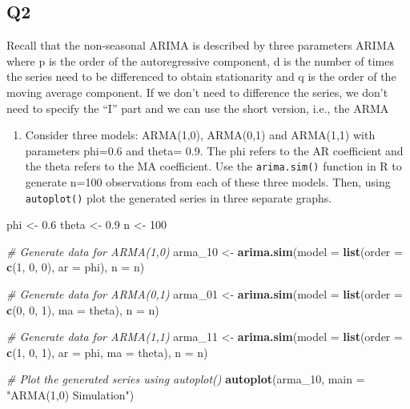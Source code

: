 \documentclass[
]{article}
\newenvironment{Shaded}{\begin{snugshade}}{\end{snugshade}}
\newcommand{\AttributeTok}[1]{\textcolor[rgb]{0.13,0.29,0.53}{#1}}
\newcommand{\CommentTok}[1]{\textcolor[rgb]{0.56,0.35,0.01}{\textit{#1}}}
\newcommand{\DecValTok}[1]{\textcolor[rgb]{0.00,0.00,0.81}{#1}}
\newcommand{\FloatTok}[1]{\textcolor[rgb]{0.00,0.00,0.81}{#1}}
\newcommand{\FunctionTok}[1]{\textcolor[rgb]{0.13,0.29,0.53}{\textbf{#1}}}
\newcommand{\NormalTok}[1]{#1}
\newcommand{\OtherTok}[1]{\textcolor[rgb]{0.56,0.35,0.01}{#1}}
\newcommand{\StringTok}[1]{\textcolor[rgb]{0.31,0.60,0.02}{#1}}
\providecommand{\tightlist}{%
  \setlength{\itemsep}{0pt}\setlength{\parskip}{0pt}}
\begin{document}
\hypertarget{q2}{%
\subsection{Q2}\label{q2}}

Recall that the non-seasonal ARIMA is described by three parameters
ARIMA where p is the order of the autoregressive component, d is the
number of times the series need to be differenced to obtain stationarity
and q is the order of the moving average component. If we don't need to
difference the series, we don't need to specify the ``I'' part and we
can use the short version, i.e., the ARMA

\begin{enumerate}
\def\labelenumi{(\alph{enumi})}
\tightlist
\item
  Consider three models: ARMA(1,0), ARMA(0,1) and ARMA(1,1) with
  parameters phi=0.6 and theta= 0.9. The phi refers to the AR
  coefficient and the theta refers to the MA coefficient. Use the
  \texttt{arima.sim()} function in R to generate n=100 observations from
  each of these three models. Then, using \texttt{autoplot()} plot the
  generated series in three separate graphs.
\end{enumerate}

\begin{Shaded}
\begin{Highlighting}[]
\NormalTok{phi }\OtherTok{\textless{}{-}} \FloatTok{0.6}
\NormalTok{theta }\OtherTok{\textless{}{-}} \FloatTok{0.9}
\NormalTok{n }\OtherTok{\textless{}{-}} \DecValTok{100}

\CommentTok{\# Generate data for ARMA(1,0)}
\NormalTok{arma\_10 }\OtherTok{\textless{}{-}} \FunctionTok{arima.sim}\NormalTok{(}\AttributeTok{model =} \FunctionTok{list}\NormalTok{(}\AttributeTok{order =} \FunctionTok{c}\NormalTok{(}\DecValTok{1}\NormalTok{, }\DecValTok{0}\NormalTok{, }\DecValTok{0}\NormalTok{), }\AttributeTok{ar =}\NormalTok{ phi), }\AttributeTok{n =}\NormalTok{ n)}

\CommentTok{\# Generate data for ARMA(0,1)}
\NormalTok{arma\_01 }\OtherTok{\textless{}{-}} \FunctionTok{arima.sim}\NormalTok{(}\AttributeTok{model =} \FunctionTok{list}\NormalTok{(}\AttributeTok{order =} \FunctionTok{c}\NormalTok{(}\DecValTok{0}\NormalTok{, }\DecValTok{0}\NormalTok{, }\DecValTok{1}\NormalTok{), }\AttributeTok{ma =}\NormalTok{ theta), }\AttributeTok{n =}\NormalTok{ n)}

\CommentTok{\# Generate data for ARMA(1,1)}
\NormalTok{arma\_11 }\OtherTok{\textless{}{-}} \FunctionTok{arima.sim}\NormalTok{(}\AttributeTok{model =} \FunctionTok{list}\NormalTok{(}\AttributeTok{order =} \FunctionTok{c}\NormalTok{(}\DecValTok{1}\NormalTok{, }\DecValTok{0}\NormalTok{, }\DecValTok{1}\NormalTok{), }\AttributeTok{ar =}\NormalTok{ phi, }\AttributeTok{ma =}\NormalTok{ theta), }\AttributeTok{n =}\NormalTok{ n)}

\CommentTok{\# Plot the generated series using autoplot()}
\FunctionTok{autoplot}\NormalTok{(arma\_10, }\AttributeTok{main =} \StringTok{"ARMA(1,0) Simulation"}\NormalTok{) }
\end{Highlighting}
\end{Shaded}
\end{document}
